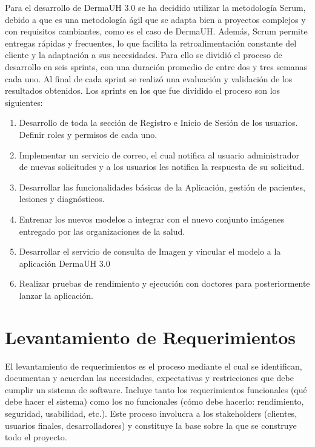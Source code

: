 Para el desarrollo de DermaUH 3.0 se ha decidido utilizar la metodología Scrum, debido a que es una metodología ágil que 
se adapta bien a proyectos complejos y con requisitos cambiantes, como es el caso de DermaUH. Además, Scrum permite entregas rápidas y 
frecuentes, lo que facilita la retroalimentación constante del cliente y la adaptación a sus necesidades.
Para ello se dividi\'o el proceso de desarrollo en seis sprints, con una duraci\'on promedio de entre dos y tres semanas cada uno.
Al final de cada sprint se realiz\'o una evaluaci\'on y validaci\'on de los resultados obtenidos. Los sprints en los que fue dividido el proceso
son los siguientes:

\begin{enumerate}
    \item Desarrollo de toda la secci\'on de Registro e Inicio de Sesi\'on de los usuarios. Definir roles y permisos de cada uno.
    \item Implementar un servicio de correo, el cual notifica al usuario administrador de nuevas solicitudes y a los usuarios les notifica la respuesta de su solicitud.
    \item Desarrollar las funcionalidades b\'asicas de la Aplicaci\'on, gesti\'on de pacientes, lesiones y diagn\'osticos.
    \item Entrenar los nuevos modelos a integrar con el nuevo conjunto im\'agenes entregado por las organizaciones de la salud.
    \item Desarrollar el servicio de consulta de Imagen y vincular el modelo a la aplicaci\'on DermaUH 3.0
    \item Realizar pruebas de rendimiento y ejecuci\'on con doctores para posteriormente lanzar la aplicaci\'on.
\end{enumerate}

\section{Levantamiento de Requerimientos}
El levantamiento de requerimientos es el proceso mediante el cual se identifican, 
documentan y acuerdan las necesidades, expectativas y restricciones que debe cumplir un 
sistema de software. Incluye tanto los requerimientos funcionales (qué debe hacer el sistema) 
como los no funcionales (cómo debe hacerlo: rendimiento, seguridad, usabilidad, etc.). 
Este proceso involucra a los stakeholders (clientes, usuarios finales, desarrolladores) y 
constituye la base sobre la que se construye todo el proyecto.

